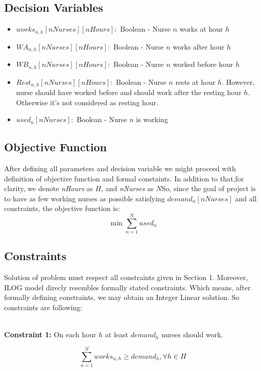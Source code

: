 \documentclass{article}
\newcommand\tab[1][1cm]{\hspace*{#1}}
\begin{document}
	\subsection{Decision Variables}
	\begin{itemize}
		\item $works_{n,h}[nNurses][nHours]:$ Boolean - Nurse $n$ works at hour $h$
		\item $WA_{n,h}[nNurses][nHours]:$ Boolean - Nurse $n$ works after hour $h$
		\item $WB_{n,h}[nNurses][nHours]:$ Boolean - Nurse $n$ worked before hour $h$
		\item $Rest_{n,h}[nNurses][nHours]:$ Boolean - Nurse $n$ rests at hour $h$. However, nurse should have worked before and should work after the resting hour $h$. Otherwise it's not considered as resting hour.
		\item $used_n[nNurses]:$ Boolean - Nurse $n$ is working
	\end{itemize}
	
	\subsection{Objective Function}
\tab After defining all parameters and decision variable we might proceed with definition of objective function and formal constaints. In addition to that,for clarity, we denote \textit{nHours} as $H$, and \textit{nNurses} as $N$So, since the goal of project is to have as few working nurses as possible satisfying $demand_n[nNurses]$ and all constraints, the objective function is:
\begin{equation}
	\min \sum_{n=1}^N used_n 
\end{equation}
	\subsection{Constraints}
\tab Solution of problem must respect all constraints given in Section 1. Moreover, ILOG model direcly resembles formally stated constraints. Which means, after formally defining constraints, we may obtain an Integer Linear solution. So constraints are following:\\\\

\begin{minipage}{\linewidth}
\tab\caption{\textbf{Constraint 1:} On each hour $h$ at least $demand_h$ nurses should work.}
	\begin{equation}
		\sum_{n=1}^N works_{n,h} \geq demand_h, \forall h \in H
	\end{equation}
\end{minipage}
\end{document}

